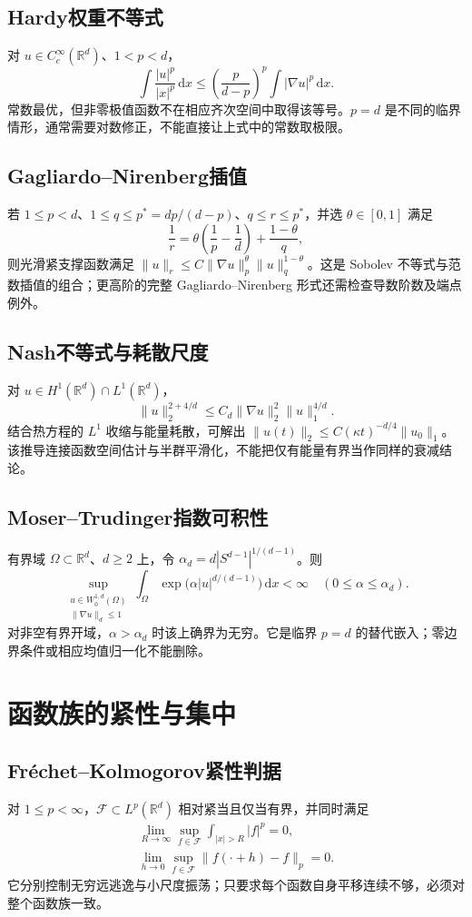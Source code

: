 \documentclass[../main.tex]{subfiles}
\begin{document}
\subsection{Hardy权重不等式}
对 $u\in C_c^\infty(\mathbb R^d)$、$1<p<d$，
\[
\int\frac{|u|^p}{|x|^p}\,\mathrm dx
\le\left(\frac p{d-p}\right)^p\int|\nabla u|^p\,\mathrm dx.
\]
常数最优，但非零极值函数不在相应齐次空间中取得该等号。$p=d$ 是不同的临界情形，通常需要对数修正，不能直接让上式中的常数取极限。
\subsection{Gagliardo--Nirenberg插值}
若 $1\le p<d$、$1\le q\le p^*=dp/(d-p)$、$q\le r\le p^*$，并选 $\theta\in[0,1]$ 满足
\[
\frac1r=\theta\left(\frac1p-\frac1d\right)+\frac{1-\theta}q,
\]
则光滑紧支撑函数满足 $\|u\|_r\le C\|\nabla u\|_p^\theta\|u\|_q^{1-\theta}$。这是 Sobolev 不等式与范数插值的组合；更高阶的完整 Gagliardo--Nirenberg 形式还需检查导数阶数及端点例外。
\subsection{Nash不等式与耗散尺度}
对 $u\in H^1(\mathbb R^d)\cap L^1(\mathbb R^d)$，
\[
\|u\|_2^{2+4/d}\le C_d\|\nabla u\|_2^2\|u\|_1^{4/d}.
\]
结合热方程的 $L^1$ 收缩与能量耗散，可解出 $\|u(t)\|_2\le C(\kappa t)^{-d/4}\|u_0\|_1$。该推导连接函数空间估计与半群平滑化，不能把仅有能量有界当作同样的衰减结论。
\subsection{Moser--Trudinger指数可积性}
有界域 $\Omega\subset\mathbb R^d$、$d\ge2$ 上，令 $\alpha_d=d|S^{d-1}|^{1/(d-1)}$。则
\[
\sup_{\substack{u\in W_0^{1,d}(\Omega)\\\|\nabla u\|_d\le1}}
\int_\Omega\exp\bigl(\alpha|u|^{d/(d-1)}\bigr)\,\mathrm dx<\infty
\quad(0\le\alpha\le\alpha_d).
\]
对非空有界开域，$\alpha>\alpha_d$ 时该上确界为无穷。它是临界 $p=d$ 的替代嵌入；零边界条件或相应均值归一化不能删除。
\section{函数族的紧性与集中}\label{sec:ra-compactness}
\subsection{Fréchet--Kolmogorov紧性判据}
对 $1\le p<\infty$，$\mathcal F\subset L^p(\mathbb R^d)$ 相对紧当且仅当有界，并同时满足
\begin{gather*}
\lim_{R\to\infty}\sup_{f\in\mathcal F}\int_{|x|>R}|f|^p=0,\\
\lim_{h\to0}\sup_{f\in\mathcal F}\|f(\cdot+h)-f\|_p=0.
\end{gather*}
它分别控制无穷远逃逸与小尺度振荡；只要求每个函数自身平移连续不够，必须对整个函数族一致。
\end{document}
